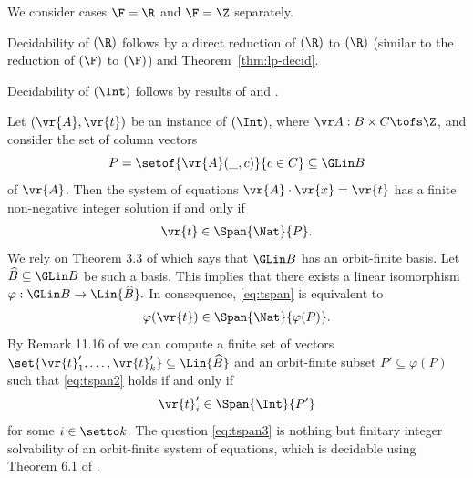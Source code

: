 We consider cases $\F = \R$ and $\F = \Z$ separately. 


Decidability of \finnonnegsolvname$(\R)$ follows by a direct reduction of 
\finnonnegsolvname$(\R)$ to \nonnegsolvname$(\R)$
(similar to the reduction of \finineqmaxname$(\F)$ to \ineqmaxname$(\F)$)
and Theorem~\ref{thm:lp-decid}.


Decidability of \finnonnegsolvname$(\Int)$ follows by results of \cite{GHL22} and \cite{HR21}.

Let $(\vr{A},\vr{t})$ be an instance of \mbox{\finnonnegsolvname$(\Int)$}, where
$\vr A : B\times C \tofs \Z$, and
consider the set of column vectors 
\[
P = \setof{\vr{A}(\_,c)}{c \in C} \subseteq \GLin B
\]
of $\vr{A}$.
Then the system of equations $\vr{A} \cdot \vr{x} = \vr{t}$ has a finite 
non-negative integer solution if and only if 
\begin{align}\label{eq:tspan}
\vr{t} \in \Span{\Nat}{P}.
\end{align}
We rely on Theorem 3.3 of \cite{GHL22} which says that $\GLin B$ has an orbit-finite basis.
Let $\widehat{B} \subseteq \GLin B$ be such a basis.
This implies that there exists a linear isomorphism 
$
\varphi : \GLin B \to\Lin{\widehat{B}}.
$
In consequence, \eqref{eq:tspan} is equivalent to
\begin{align} \label{eq:tspan2}
\varphi(\vr{t}) \in \Span{\Nat}{\varphi(P)}.
\end{align}
By Remark 11.16 of \cite{HR21} we can compute a finite set of vectors 
$\set{\vr{t}'_1,\dots,\vr{t}'_k}\subseteq \Lin {\widehat B}$ and an orbit-finite subset 
$P'\subseteq\varphi(P)$ such 
that \eqref{eq:tspan2}
holds if and only if 
\begin{align} \label{eq:tspan3}
\vr{t}'_i \in \Span{\Int}{P'}
\end{align} 
for some $i\in\setto k$.
The question \eqref{eq:tspan3} is nothing but finitary integer solvability of an orbit-finite system of equations,
which is decidable using Theorem 6.1 of \cite{GHL22}.


%
%
%




